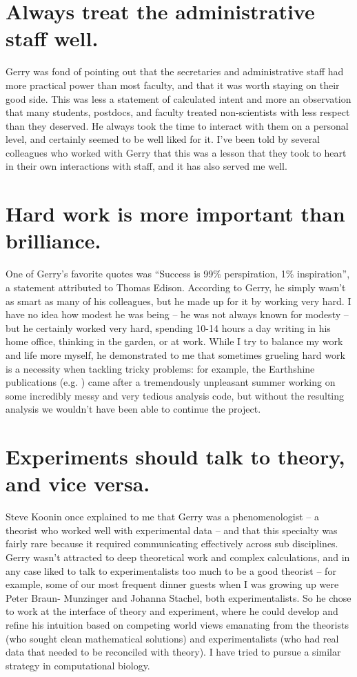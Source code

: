 \section*{Always treat the administrative staff well.}

Gerry was fond of pointing out that the secretaries and administrative
staff had more practical power than most faculty, and that it was
worth staying on their good side. This was less a statement of
calculated intent and more an observation that many students,
postdocs, and faculty treated non-scientists with less respect than
they deserved. He always took the time to interact with them on a
personal level, and certainly seemed to be well liked for it. I've
been told by several colleagues who worked with Gerry that this was a
lesson that they took to heart in their own interactions with staff,
and it has also served me well.

\section*{Hard work is more important than brilliance.}

One of Gerry's favorite quotes was ``Success is 99\% perspiration, 1\%
inspiration'', a statement attributed to Thomas Edison. According to
Gerry, he simply wasn't as smart as many of his colleagues, but he
made up for it by working very hard. I have no idea how modest he was
being -- he was not always known for modesty -- but he certainly
worked very hard, spending 10-14 hours a day writing in his home
office, thinking in the garden, or at work. While I try to balance my
work and life more myself, he demonstrated to me that sometimes
grueling hard work is a necessity when tackling tricky problems: for
example, the Earthshine publications (e.g. \cite{goode2001earthshine})
came after a tremendously unpleasant summer working on some incredibly
messy and very tedious analysis code, but without the resulting
analysis we wouldn't have been able to continue the project.

\section*{Experiments should talk to theory, and vice versa.}

Steve Koonin once explained to me that Gerry was a phenomenologist -- a
theorist who worked well with experimental data -- and that this
specialty was fairly rare because it required communicating
effectively across sub disciplines. Gerry wasn't attracted to deep
theoretical work and complex calculations, and in any case liked to
talk to experimentalists too much to be a good theorist -- for example,
some of our most frequent dinner guests when I was growing up were
Peter Braun- Munzinger and Johanna Stachel, both experimentalists. So
he chose to work at the interface of theory and experiment, where he
could develop and refine his intuition based on competing world views
emanating from the theorists (who sought clean mathematical solutions)
and experimentalists (who had real data that needed to be reconciled
with theory). I have tried to pursue a similar strategy in
computational biology.

